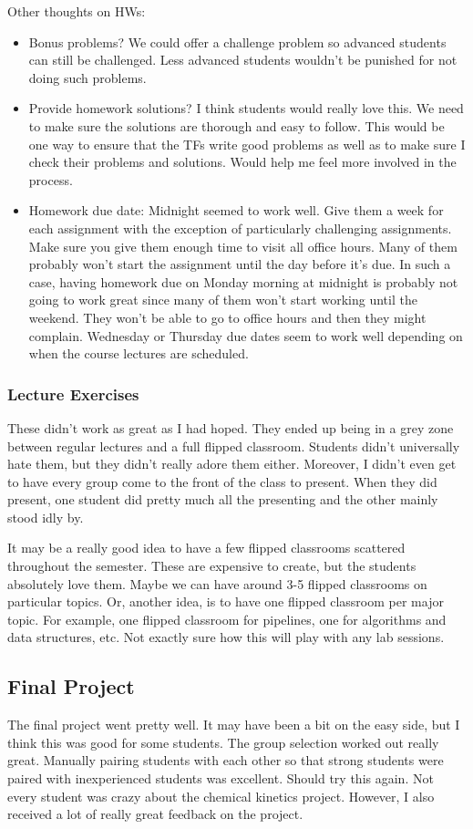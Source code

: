 \documentclass[11pt]{article}
\begin{document}
        Other thoughts on HWs:
        \begin{itemize}
          \item Bonus problems?  We could offer a challenge problem so advanced
students can still be challenged.  Less advanced students wouldn't be punished
for not doing such problems.
          \item Provide homework solutions?  I think students would really love
this.  We need to make sure the solutions are thorough and easy to follow.  This
would be one way to ensure that the TFs write good problems as well as to make
sure I check their problems and solutions.  Would help me feel more involved in
the process.
          \item Homework due date:  Midnight seemed to work well.  Give them a
week for each assignment with the exception of particularly challenging
assignments.  Make sure you give them enough time to visit all office hours.
Many of them probably won't start the assignment until the day before it's due.
In such a case, having homework due on Monday morning at midnight is probably
not going to work great since many of them won't start working until the
weekend.  They won't be able to go to office hours and then they might
complain.  Wednesday or Thursday due dates seem to work well depending on when
the course lectures are scheduled.
        \end{itemize}
      \subsubsection{Lecture Exercises}
        These didn't work as great as I had hoped.  They ended up being in a
grey zone between regular lectures and a full flipped classroom.  Students
didn't universally hate them, but they didn't really adore them either.
Moreover, I didn't even get to have every group come to the front of the class
to present.  When they did present, one student did pretty much all the
presenting and the other mainly stood idly by.

        It may be a really good idea to have a few flipped classrooms scattered
throughout the semester.  These are expensive to create, but the students
absolutely love them.  Maybe we can have around 3-5 flipped classrooms on
particular topics.  Or, another idea, is to have one flipped classroom per major
topic.  For example, one flipped classroom for pipelines, one for algorithms and
data structures, etc.  Not exactly sure how this will play with any lab
sessions.
    \subsection{Final Project}
      The final project went pretty well.  It may have been a bit on the easy
side, but I think this was good for some students.  The group selection worked
out really great.  Manually pairing students with each other so that strong
students were paired with inexperienced students was excellent.  Should try this
again.  Not every student was crazy about the chemical kinetics project.
However, I also received a lot of really great feedback on the project.  
\end{document}
